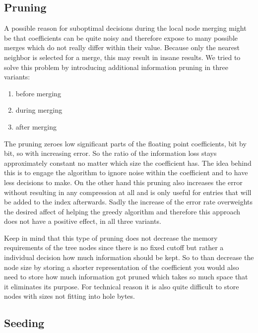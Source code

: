 \subsection{Pruning}
\label{ssec:algorithm:fail:pruning}

A possible reason for suboptimal decisions during the local node merging might be that coefficients can be quite noisy and therefore expose to many possible merges which do not really differ within their value. Because only the nearest neighbor is selected for a merge, this may result in insane results. We tried to solve this problem by introducing additional information pruning in three variants:

\begin{enumerate}
    \item before merging
    \item during merging
    \item after merging
\end{enumerate}

The pruning zeroes low significant parts of the floating point coefficients, bit by bit, so with increasing error. So the ratio of the information loss stays approximately constant no matter which size the coefficient has. The idea behind this is to engage the algorithm to ignore noise within the coefficient and to have less decisions to make. On the other hand this pruning also increases the error without resulting in any compression at all and is only useful for entries that will be added to the index afterwards. Sadly the increase of the error rate overweights the desired affect of helping the greedy algorithm and therefore this approach does not have a positive effect, in all three variants.

Keep in mind that this type of pruning does not decrease the memory requirements of the tree nodes since there is no fixed cutoff but rather a individual decision how much information should be kept. So to than decrease the node size by storing a shorter representation of the coefficient you would also need to store how much information got pruned which takes so much space that it eliminates its purpose. For technical reason it is also quite difficult to store nodes with sizes not fitting into hole bytes.


\subsection{Seeding}
\label{ssec:algorithm:fail:seed}

